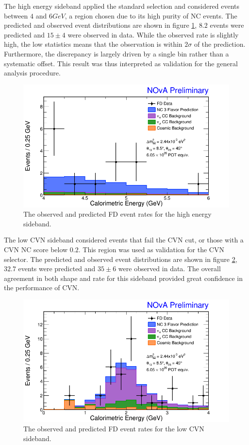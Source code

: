 The high energy sideband applied the standard selection and considered events between $4$ and $6\unit{GeV}$, a region chosen due to its high purity of NC events. The predicted and observed event distributions are shown in figure \ref{fig:SidebandHighE}, $8.2$ events were predicted and $15 \pm 4$ were observed in data. While the observed rate is slightly high, the low statistics means that the observation is within $2\sigma$ of the prediction. Furthermore, the discrepancy is largely driven by a single bin rather than a systematic offset. This result was thus interpreted as validation for the general analysis procedure.
\begin{figure}[htbp]
  \centering
  \includegraphics[width=1\textwidth]{figures/Ana01Results/FDHighECalEDataMCStack.png}
  \caption[High Energy Sideband]{The observed and predicted FD event rates for the high energy sideband.}
  \label{fig:SidebandHighE}
\end{figure}

The low CVN sideband considered events that fail the CVN cut, or those with a CVN NC score below $0.2$. This region was used as validation for the CVN selector. The predicted and observed event distributions are shown in figure \ref{fig:SidebandLowCVN}, $32.7$ events were predicted and $35 \pm 6$ were observed in data. The overall agreement in both shape and rate for this sideband provided great confidence in the performance of CVN.
\begin{figure}[htbp]
  \centering
  \includegraphics[width=1\textwidth]{figures/Ana01Results/FDLowCVNCalEDataMCStack.png}
  \caption[Low CVN Sideband]{The observed and predicted FD event rates for the low CVN sideband.}
  \label{fig:SidebandLowCVN}
\end{figure}

